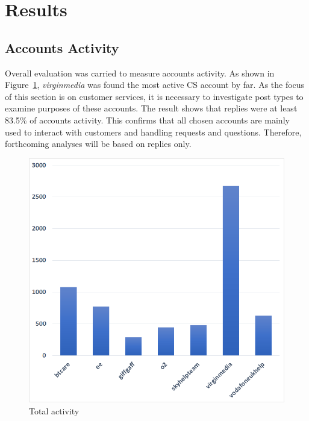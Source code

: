 \documentclass[sigconf]{acmart}
\begin{document}
\section{Results}\label{results}

\subsection{Accounts Activity}

Overall evaluation was carried to measure accounts activity. As shown in
Figure~\ref{fig:totalactivity}, {\emph{virginmedia}} was found the most 
active CS account by far. As the focus of this section is on customer services, 
it is necessary to investigate post types to examine purposes of
these accounts. The result shows that replies were at least 83.5\% of
accounts activity. This confirms that all chosen accounts are mainly
used to interact with customers and handling requests and
questions. Therefore, forthcoming analyses will be based on replies
only. 

\begin{figure}[htb]
\centering
\includegraphics[width=\columnwidth]{images/totalactivity.png}
\caption{Total activity}
\label{fig:totalactivity}
\end{figure}

\end{document}
